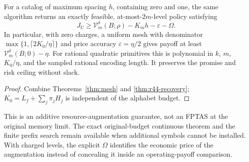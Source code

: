 \begin{corollary}\label{cor:r44-continuous}
For a catalog of maximum spacing $h$, containing zero and one, the same algorithm returns an exactly feasible, at-most-$2m$-level policy satisfying
\[
 J_U\geq\mathcal V_m^\delta(B;\rho)-K_mh-\varepsilon-\Omega.
\]
In particular, with zero charges, a uniform mesh with denominator
$\max\{1,\lceil2K_0/\eta\rceil\}$ and price accuracy $\varepsilon=\eta/2$ gives payoff at least $\mathcal V_m^\delta(B;0)-\eta$. For rational quadratic primitives this is polynomial in $k$, $m$, $K_0/\eta$, and the sampled rational encoding length. It preserves the promise and risk ceiling without slack.
\end{corollary}
\begin{proof}
Combine Theorems~\ref{thm:mesh} and \ref{thm:r44-recovery}; $K_0=L_f+\sum_j\pi_jH_j$ is independent of the alphabet budget.
\end{proof}
This is an additive resource-augmentation guarantee, not an FPTAS at the original memory limit. The exact original-budget continuous theorem and the finite prefix search remain available when additional symbols cannot be installed. With charged levels, the explicit $\Omega$ identifies the economic price of the augmentation instead of concealing it inside an operating-payoff comparison.

